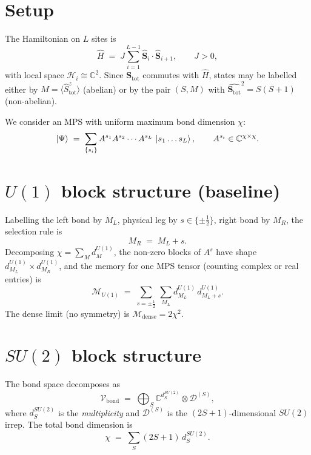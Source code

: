 \documentclass[11pt,a4paper]{article}
\newcommand{\Hil}{\mathcal{H}}
\newcommand{\Stot}{\mathbf{S}_{\mathrm{tot}}}
\newcommand{\mem}{\mathcal{M}}
\begin{document}
\section{Setup}

The Hamiltonian on $L$ sites is
\begin{equation}
\hat H \;=\; J \sum_{i=1}^{L-1} \hat{\mathbf S}_i \cdot \hat{\mathbf S}_{i+1}, \qquad J>0,
\end{equation}
with local space $\Hil_i \cong \mathbb{C}^2$. Since $\Stot$ commutes with $\hat H$, states may be labelled either by $M=\langle\hat S^z_{\mathrm{tot}}\rangle$ (abelian) or by the pair $(S,M)$ with $\hat{\Stot}^2 = S(S+1)$ (non-abelian).

We consider an MPS with uniform maximum bond dimension $\chi$:
\begin{equation}
\ket{\Psi} \;=\; \sum_{\{s_i\}} A^{s_1} A^{s_2}\cdots A^{s_L}\,\ket{s_1\ldots s_L}, \qquad A^{s_i} \in \mathbb{C}^{\chi\times\chi}.
\end{equation}

\section{$U(1)$ block structure (baseline)}

Labelling the left bond by $M_L$, physical leg by $s \in \{\pm\tfrac12\}$, right bond by $M_R$, the selection rule is
\begin{equation}
M_R \;=\; M_L + s.
\end{equation}
Decomposing $\chi = \sum_M d^{U(1)}_M$, the non-zero blocks of $A^s$ have shape $d^{U(1)}_{M_L} \times d^{U(1)}_{M_R}$, and the memory for one MPS tensor (counting complex or real entries) is
\begin{equation}
\mem_{U(1)} \;=\; \sum_{s=\pm\tfrac12}\,\sum_{M_L} d^{U(1)}_{M_L}\, d^{U(1)}_{M_L + s}.
\label{eq:MU1}
\end{equation}
The dense limit (no symmetry) is $\mem_{\mathrm{dense}} = 2\chi^2$.

\section{$SU(2)$ block structure}

The bond space decomposes as
\begin{equation}
\mathcal V_{\mathrm{bond}} \;=\; \bigoplus_{S} \mathbb{C}^{d^{SU(2)}_S} \otimes \mathcal D^{(S)},
\end{equation}
where $d^{SU(2)}_S$ is the \emph{multiplicity} and $\mathcal D^{(S)}$ is the $(2S+1)$-dimensional $SU(2)$ irrep. The total bond dimension is
\begin{equation}
\chi \;=\; \sum_S (2S+1)\, d^{SU(2)}_S.
\label{eq:chi-decomp}
\end{equation}
\end{document}
